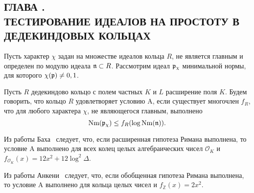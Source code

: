 \documentclass[_00_dissertation.tex]{subfiles}
\begin{document}
\onlyinsubfile{
    \renewcommand{\contentsname}{ОГЛАВЛЕНИЕ}
    \setcounter{tocdepth}{3}
    \tableofcontents
}

\newpage
\begin{center}
    \section*{ГЛАВА .\\ ТЕСТИРОВАНИЕ ИДЕАЛОВ НА ПРОСТОТУ В ДЕДЕКИНДОВЫХ КОЛЬЦАХ}\label{section:Primality}
\end{center}

\begin{definition}
    Пусть характер $\chi$ задан на множестве идеалов кольца $R$, не является главным и определен по модулю идеала $\mathfrak{n} \subset R$.
    Рассмотрим идеал $\mathfrak{p}_{\chi}$ минимальной нормы, для которого $\chi(\mathfrak{p}) \neq 0, 1$.

    Пусть $R$ дедекиндово кольцо с полем частных $K$ и $L$ расширение поля $K$.
    Будем говорить, что кольцо $R$ удовлетворяет условию A, если существует многочлен $f_R$, что для любого характера $\chi$, не являющегося главным, выполнено
    \begin{equation*}
        \textrm{Nm}(\mathfrak{p}_{\chi}) \le f_R(\log{\textrm{Nm}(\mathfrak{n})}).
    \end{equation*}
\end{definition}

\begin{remark}
    Из работы Баха~\cite{source:Bach} следует, что, если расширенная гипотеза Римана выполнена, то условие A выполнено для всех колец целых алгебраических чисел $\mathcal{O}_K$ и $f_{\mathcal{O}_K}(x) = 12x^2 + 12\log^2 \Delta$.
\end{remark}

\begin{remark}
    Из работы Анкени~\cite{source:Ankeny} следует, что, если обобщенная гипотеза Римана выполнена, то условие A выполнено для кольца целых чисел и $f_{\mathbb{Z}}(x) = 2x^2$.
\end{remark}
\end{document}

